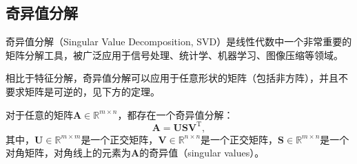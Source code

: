 \subsection{奇异值分解}

奇异值分解（Singular Value Decomposition, SVD）是线性代数中一个非常重要的矩阵分解工具，被广泛应用于信号处理、统计学、机器学习、图像压缩等领域。

相比于特征分解，奇异值分解可以应用于任意形状的矩阵（包括非方阵），并且不要求矩阵是可逆的，见下方的定理。

\begin{theorem}
    对于任意的矩阵\( \mathbf{A} \in \mathbb{R}^{m \times n} \)，都存在一个奇异值分解：
    \[
        \mathbf{A} = \mathbf{U} \mathbf{S} \mathbf{V}^{\mathrm{T}},
    \]
    其中，\( \mathbf{U} \in \mathbb{R}^{m \times m} \)是一个正交矩阵，\( \mathbf{V} \in \mathbb{R}^{n \times n} \)是一个正交矩阵，\( \mathbf{S} \in \mathbb{R}^{m \times n} \)是一个对角矩阵，对角线上的元素为\( \mathbf{A} \)的奇异值（singular values）。
\end{theorem}
